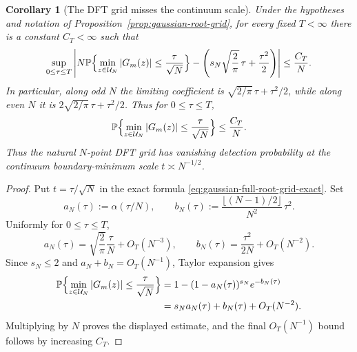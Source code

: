 \documentclass[11pt]{amsart}
\numberwithin{equation}{section}
\newtheorem{corollary}[theorem]{Corollary}
\theoremstyle{definition}
\theoremstyle{remark}
\newcommand{\Prob}{\mathbb P}
\newcommand{\abs}[1]{\left\lvert #1\right\rvert}
\begin{document}
\begin{corollary}[The DFT grid misses the continuum scale]\label{cor:gaussian-root-grid-misses}
Under the hypotheses and notation of Proposition~\ref{prop:gaussian-root-grid},
for every fixed \(T<\infty\) there is a constant \(C_T<\infty\) such that
\[
  \sup_{0\le \tau\le T}
  \left|
  N\Prob\Bigl\{\min_{z\in\mathcal U_N}\abs{G_m(z)}
       \le \frac{\tau}{\sqrt N}\Bigr\}
  -
  \left(s_N\sqrt{\frac2\pi}\,\tau+\frac{\tau^2}{2}\right)
  \right|
  \le \frac{C_T}{N}.
\]
In particular, along odd \(N\) the limiting coefficient is
\(\sqrt{2/\pi}\,\tau+\tau^2/2\), while along even \(N\) it is
\(2\sqrt{2/\pi}\,\tau+\tau^2/2\).  Thus
for \(0\le\tau\le T\),
\[
  \Prob\Bigl\{\min_{z\in\mathcal U_N}\abs{G_m(z)}
       \le \frac{\tau}{\sqrt N}\Bigr\}
  \le \frac{C_T}{N}.
\]
Thus the natural \(N\)-point DFT grid has vanishing detection probability at
the continuum boundary-minimum scale \(t\asymp N^{-1/2}\).
\end{corollary}

\begin{proof}
Put \(t=\tau/\sqrt N\) in the exact formula
\eqref{eq:gaussian-full-root-grid-exact}.  Set
\[
  a_N(\tau):=\alpha(\tau/N),
  \qquad
  b_N(\tau):=\frac{\lfloor(N-1)/2\rfloor}{N^2}\,\tau^2 .
\]
Uniformly for \(0\le\tau\le T\),
\[
  a_N(\tau)=\sqrt{\frac2\pi}\frac{\tau}{N}+O_T(N^{-3}),
  \qquad
  b_N(\tau)=\frac{\tau^2}{2N}+O_T(N^{-2}).
\]
Since \(s_N\le2\) and \(a_N+b_N=O_T(N^{-1})\), Taylor expansion gives
\begin{align*}
  \Prob\Bigl\{\min_{z\in\mathcal U_N}\abs{G_m(z)}\le
       \frac{\tau}{\sqrt N}\Bigr\}
  &=1-(1-a_N(\tau))^{s_N}e^{-b_N(\tau)}\\
  &=s_Na_N(\tau)+b_N(\tau)+O_T(N^{-2}).
\end{align*}
Multiplying by \(N\) proves the displayed estimate, and the final \(O_T(N^{-1})\)
bound follows by increasing \(C_T\).
\end{proof}
\end{document}
